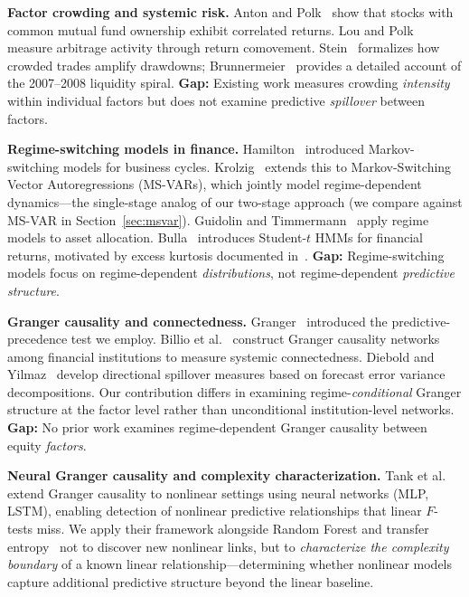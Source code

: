 \documentclass{uai2026}
\begin{document}
\textbf{Factor crowding and systemic risk.}
Anton and Polk~\cite{anton2014connected} show that stocks with common mutual fund
ownership exhibit correlated returns. Lou and Polk~\cite{lou2022comomentum} measure
arbitrage activity through return comovement. Stein~\cite{stein2009presidential}
formalizes how crowded trades amplify drawdowns; Brunnermeier~\cite{brunnermeier2009deciphering}
provides a detailed account of the 2007--2008 liquidity spiral.
\textbf{Gap:} Existing work measures crowding \emph{intensity} within individual
factors but does not examine predictive \emph{spillover} between factors.

\textbf{Regime-switching models in finance.}
Hamilton~\cite{hamilton1989new} introduced Markov-switching models for business cycles.
Krolzig~\cite{krolzig1997markov} extends this to Markov-Switching Vector
Autoregressions (MS-VARs), which jointly model regime-dependent dynamics---the
single-stage analog of our two-stage approach (we compare against MS-VAR
in Section~\ref{sec:msvar}).
Guidolin and Timmermann~\cite{guidolin2007asset} apply regime models to asset allocation.
Bulla~\cite{bulla2011hidden} introduces Student-$t$ HMMs for financial returns,
motivated by excess kurtosis documented in~\cite{cont2001empirical}.
\textbf{Gap:} Regime-switching models focus on regime-dependent \emph{distributions},
not regime-dependent \emph{predictive structure}.

\textbf{Granger causality and connectedness.}
Granger~\cite{granger1969investigating} introduced the predictive-precedence test
we employ. Billio et al.~\cite{billio2012econometric} construct Granger causality
networks among financial institutions to measure systemic connectedness.
Diebold and Yilmaz~\cite{diebold2012better} develop directional spillover measures
based on forecast error variance decompositions. Our contribution differs in
examining regime-\emph{conditional} Granger structure at the factor level rather
than unconditional institution-level networks.
\textbf{Gap:} No prior work examines regime-dependent Granger causality between
equity \emph{factors}.

\textbf{Neural Granger causality and complexity characterization.}
Tank et al.~\cite{tank2021neural} extend Granger causality to nonlinear settings
using neural networks (MLP, LSTM), enabling detection of nonlinear predictive
relationships that linear $F$-tests miss. We apply their framework alongside
Random Forest and transfer entropy~\cite{schreiber2000measuring} not to discover
new nonlinear links, but to \emph{characterize the complexity boundary} of
a known linear relationship---determining whether nonlinear models capture
additional predictive structure beyond the linear baseline.
\end{document}

